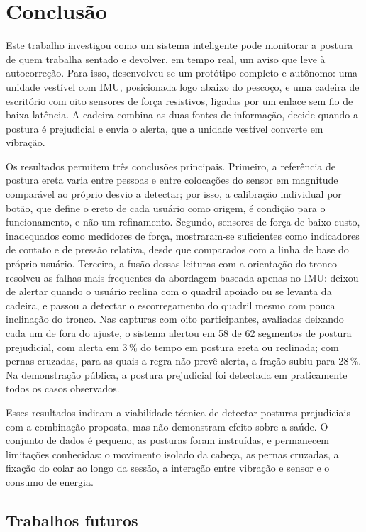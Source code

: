 \section{Conclusão}
\label{sec:conclusao}

Este trabalho investigou como um sistema inteligente pode monitorar a postura
de quem trabalha sentado e devolver, em tempo real, um aviso que leve à
autocorreção. Para isso, desenvolveu-se um protótipo completo e autônomo:
uma unidade vestível com IMU, posicionada logo abaixo do pescoço, e uma
cadeira de escritório com oito sensores de força resistivos, ligadas por um
enlace sem fio de baixa latência. A cadeira combina as duas fontes de
informação, decide quando a postura é prejudicial e envia o alerta, que a
unidade vestível converte em vibração.

Os resultados permitem três conclusões principais. Primeiro, a referência de
postura ereta varia entre pessoas e entre colocações do sensor em magnitude
comparável ao próprio desvio a detectar; por isso, a calibração individual
por botão, que define o ereto de cada usuário como origem, é condição para o
funcionamento, e não um refinamento. Segundo, sensores de força de baixo
custo, inadequados como medidores de força, mostraram-se suficientes como
indicadores de contato e de pressão relativa, desde que comparados com a
linha de base do próprio usuário. Terceiro, a fusão dessas leituras com a
orientação do tronco resolveu as falhas mais frequentes da abordagem baseada
apenas no IMU: deixou de alertar quando o usuário reclina com o quadril
apoiado ou se levanta da cadeira, e passou a detectar o escorregamento do
quadril mesmo com pouca inclinação do tronco. Nas capturas com oito
participantes, avaliadas deixando cada um de fora do ajuste, o sistema alertou
em 58 de 62 segmentos de postura prejudicial, com alerta em $3\,\%$ do tempo
em postura ereta ou reclinada; com pernas cruzadas, para as quais a regra não
prevê alerta, a fração subiu para $28\,\%$. Na demonstração pública, a
postura prejudicial foi detectada em praticamente todos os casos observados.

Esses resultados indicam a viabilidade técnica de detectar posturas
prejudiciais com a combinação proposta, mas não demonstram efeito sobre a
saúde. O conjunto de dados é pequeno, as posturas foram instruídas, e
permanecem limitações conhecidas: o movimento isolado da cabeça, as pernas cruzadas, a fixação do
colar ao longo da sessão, a interação entre vibração e sensor e o consumo de
energia.

\subsection{Trabalhos futuros}
\label{sec:trabalhos-futuros}

